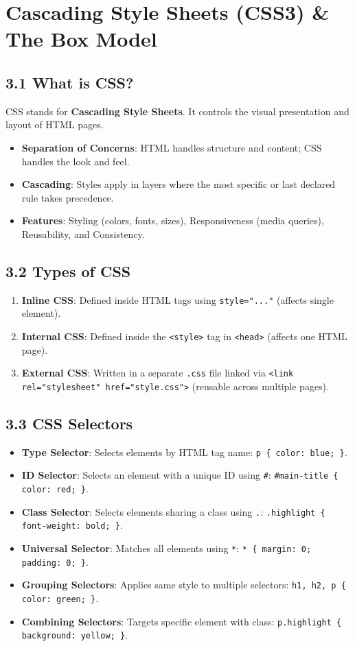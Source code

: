 \chapter{Cascading Style Sheets (CSS3) \& The Box Model}

\section{3.1 What is CSS?}
CSS stands for \textbf{Cascading Style Sheets}. It controls the visual presentation and layout of HTML pages.
\begin{itemize}[leftmargin=*]
    \item \textbf{Separation of Concerns}: HTML handles structure and content; CSS handles the look and feel.
    \item \textbf{Cascading}: Styles apply in layers where the most specific or last declared rule takes precedence.
    \item \textbf{Features}: Styling (colors, fonts, sizes), Responsiveness (media queries), Reusability, and Consistency.
\end{itemize}

\section{3.2 Types of CSS}
\begin{enumerate}[leftmargin=*]
    \item \textbf{Inline CSS}: Defined inside HTML tags using \texttt{style="..."} (affects single element).
    \item \textbf{Internal CSS}: Defined inside the \texttt{<style>} tag in \texttt{<head>} (affects one HTML page).
    \item \textbf{External CSS}: Written in a separate \texttt{.css} file linked via \texttt{<link rel="stylesheet" href="style.css">} (reusable across multiple pages).
\end{enumerate}

\section{3.3 CSS Selectors}
\begin{itemize}[leftmargin=*]
    \item \textbf{Type Selector}: Selects elements by HTML tag name: \texttt{p \{ color: blue; \}}.
    \item \textbf{ID Selector}: Selects an element with a unique ID using \texttt{\#}: \texttt{\#main-title \{ color: red; \}}.
    \item \textbf{Class Selector}: Selects elements sharing a class using \texttt{.}: \texttt{.highlight \{ font-weight: bold; \}}.
    \item \textbf{Universal Selector}: Matches all elements using \texttt{*}: \texttt{* \{ margin: 0; padding: 0; \}}.
    \item \textbf{Grouping Selectors}: Applies same style to multiple selectors: \texttt{h1, h2, p \{ color: green; \}}.
    \item \textbf{Combining Selectors}: Targets specific element with class: \texttt{p.highlight \{ background: yellow; \}}.
\end{itemize}

